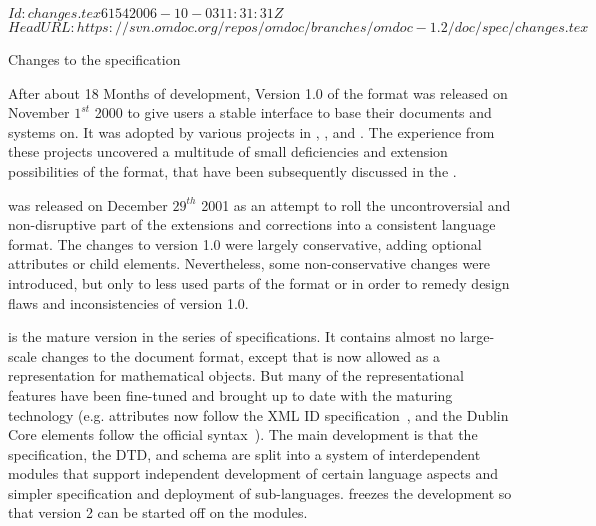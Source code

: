 \svnInfo $Id: changes.tex 6154 2006-10-03 11:31:31Z  $
\svnKeyword $HeadURL: https://svn.omdoc.org/repos/omdoc/branches/omdoc-1.2/doc/spec/changes.tex $

\begin{tchapter}[id=changelog]{Changes to the specification}

After about 18 Months of development, Version 1.0 of the {\omdoc} format was released on
November $1^{st}$ 2000 to give users a stable interface to base their documents and
systems on. It was adopted by various projects in {},
{}, and {}. The
experience from these projects uncovered a multitude of small deficiencies and extension
possibilities of the format, that have been subsequently discussed in the {\omdoc}
{}.

{} was released on December $29^{th}$ 2001 as an attempt to roll the
uncontroversial and non-disruptive part of the extensions and corrections into a
consistent language format. The changes to version 1.0 were largely conservative,
adding optional attributes or child elements. Nevertheless, some non-conservative
changes were introduced, but only to less used parts of the format or in order to
remedy design flaws and inconsistencies of version 1.0.

{} is the mature version in the {} series of specifications. It
contains almost no large-scale changes to the document format, except that {\cmathml} is
now allowed as a representation for mathematical objects. But many of the representational
features have been fine-tuned and brought up to date with the maturing {\xml} technology
(e.g. {} attributes now follow the XML ID
specification~\cite{XML:id05}, and the Dublin Core elements follow the official
syntax~\cite{DCMI:dmt03}). The main development is that the {\omdoc} specification, the
DTD, and schema are split into a system of interdependent modules that support independent
development of certain language aspects and simpler specification and deployment of
sub-languages.  {} freezes the development so that version 2 can be started
off on the modules.


\end{tchapter}
